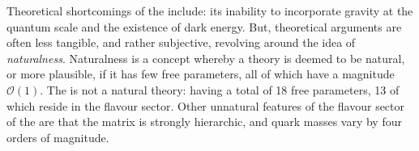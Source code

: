 Theoretical shortcomings of the \sm include: its inability to incorporate gravity at the quantum
scale and the existence of dark energy.
But, theoretical arguments are often less tangible, and
rather subjective, revolving around the idea of \emph{naturalness}.
Naturalness is a concept whereby a theory is deemed to be natural, or more plausible, if it has few
free parameters, all of which have a magnitude $\mathcal{O}(1)$.
The \sm is not a natural theory: having
a total of 18 free parameters, 13 of which reside in the flavour
sector.
Other unnatural features of the flavour sector of the \sm are that the \ckm matrix is strongly
hierarchic, and quark masses vary by four orders of magnitude.

